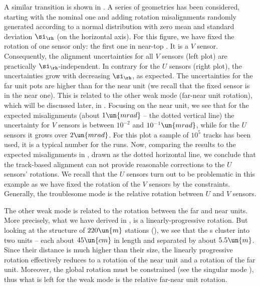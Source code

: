 A similar transition is shown in . A series of geometries has been considered, starting with the nominal one and adding rotation misalignments randomly generated according to a normal distribution with zero mean and standard deviation $\si_\rh$ (on the horizontal axis). For this figure, we have fixed the rotation of one sensor only: the first one in near-top . It is a $V$ sensor. Consequently, the alignment uncertainties for all $V$ sensors (left plot) are practically $\si_\rh$-independent. In contrary for the $U$ sensors (right plot), the uncertainties grow with decreasing $\si_\rh$, as expected. The uncertainties for the far unit pots are higher than for the near unit (we recall that the fixed sensor is in the near one). This is related to the other weak mode (far-near unit rotation), which will be discussed later, in . Focusing on the near unit, we see that for the expected misalignments (about $1\un{mrad}$ -- the dotted vertical line) the uncertainty for $V$ sensors is between $10^{-2}$ and $10^{-1}\un{mrad}$, while for the $U$ sensors it grows over $2\un{mrad}$. For this plot a sample of $10^5$ tracks has been used, it is a typical number for the  runs. Now, comparing the results to the expected misalignments in , drawn as the dotted horizontal line, we conclude that the track-based alignment can not provide reasonable corrections to the $U$ sensors' rotations. We recall that the $U$ sensors turn out to be problematic in this example as we have fixed the rotation of the $V$ sensors by the constraints. Generally, the troublesome mode is the relative rotation between $U$ and $V$ sensors.

The other weak mode is related to the rotation between the far and near units. More precisely, what we have derived in , is a linearly-progressive rotation. But looking at the structure of $220\un{m}$ stations (), we see that the s cluster into two units -- each about $45\un{cm}$ in length and separated by about $5.5\un{m}$. Since their distance is much higher than their size, the linearly progressive rotation effectively reduces to a rotation of the near unit and a rotation of the far unit. Moreover, the global rotation must be constrained (see the singular mode ), thus what is left for the weak mode is the relative far-near unit rotation.


